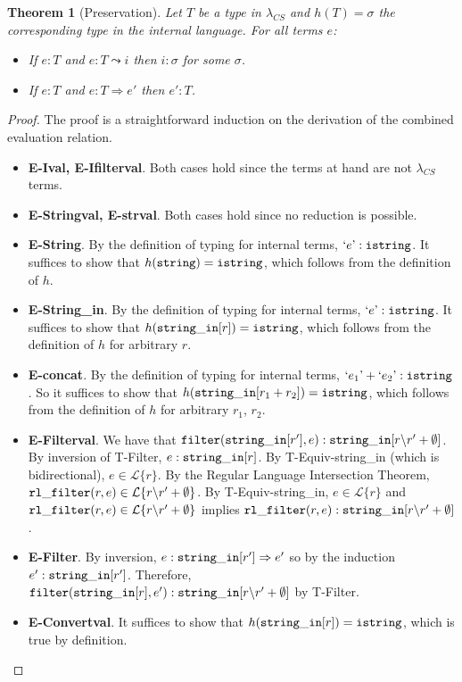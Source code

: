 \documentclass[10pt,preprint]{sigplanconf}
\newtheorem{thm}{Theorem}
\theoremstyle{definition}
\newcommand{\Lagr}{\mathcal{L}}
\newcommand{\strin}{{\tt string\_in}}
\newcommand{\lang}[1]{\Lagr\{#1\}}
\newcommand{\str}{ {\tt string} }
\newcommand{\istr}{ {\tt istring} }
\newcommand{\filter}[2]{ {\tt filter}(#1,#2) }
\newcommand{\reduces}{ \Rightarrow }
\newcommand{\ireduces}{ \leadsto }
\newcommand{\istrf}[1]{`#1\textrm'} %
\newcommand{\lcs}{\lambda_{CS}}
\begin{document}
\begin{thm}[Preservation]
  Let $T$ be a type in $\lcs$ and $h(T)=\sigma$ the corresponding type in the internal language.
  For all terms $e$:
  \begin{itemize}
    \item If $e:T$ and $e:T \ireduces i$ then $i : \sigma$ for some $\sigma$.
    \item If $e:T$ and $e:T \reduces e'$ then $e':T$.
  \end{itemize}
\end{thm}
\begin{proof}
The proof is a straightforward induction on the derivation of the combined evaluation relation.
\begin{itemize}[label=$ $,itemsep=1ex]
  \item \textbf{E-Ival, E-Ifilterval}. Both cases hold since the terms at hand are not $\lcs$ terms.
  \item \textbf{E-Stringval, E-strval}. Both cases hold since no reduction is possible. 
  \item \textbf{E-String}. By the definition of typing for internal terms, $\istrf{e} : \istr$. It suffices to show that $h(\str) = \istr$, which follows from the definition of $h$.
  \item \textbf{E-String\_in}. By the definition of typing for internal terms, $\istrf{e} : \istr$. It suffices to show that $h(\strin[r]) = \istr$, which follows from the definition of $h$ for arbitrary $r$.
  \item \textbf{E-concat}. By the definition of typing for internal terms, $\istrf{e_1} + \istrf{e_2} : \istr$. So it suffices to show that $h(\strin[r_1+r_2]) = \istr$, which follows from the definition of $h$ for arbitrary $r_1$, $r_2$.
  \item \textbf{E-Filterval}. We have that $\filter{\strin[r']}{e}:\strin[r\backslash r' + \emptyset]$. By inversion of T-Filter, $e:\strin[r]$.
    By T-Equiv-string\_in (which is bidirectional), $e \in \lang{r}$.
    By the Regular Language Intersection Theorem, ${\tt rl\_filter}(r,e) \in \lang{r\backslash r' + \emptyset}$.
    By T-Equiv-string\_in,  $e \in \lang{r}$ and ${\tt rl\_filter}(r,e) \in \lang{r\backslash r' + \emptyset}$ implies ${\tt rl\_filter}(r,e):\strin[r\backslash r' + \emptyset]$.
  \item \textbf{E-Filter}. By inversion, $e : \strin[r'] \reduces e'$ so by the induction $e':\strin[r']$.
    Therefore, ${\tt filter}(\strin[r], e') : \strin[r \backslash r' + \emptyset]$ by T-Filter.
  \item \textbf{E-Convertval}. It suffices to show that $h(\strin[r]) = \istr$, which is true by definition.

\end{itemize}
\end{proof}
\end{document}
